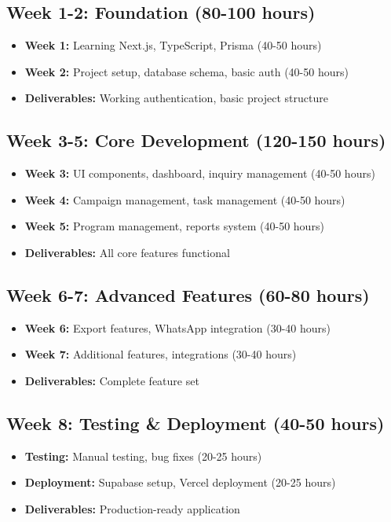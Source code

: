 \documentclass[11pt,a4paper]{article}
\begin{document}
\subsection{Week 1-2: Foundation (80-100 hours)}
\begin{itemize}
    \item \textbf{Week 1:} Learning Next.js, TypeScript, Prisma (40-50 hours)
    \item \textbf{Week 2:} Project setup, database schema, basic auth (40-50 hours)
    \item \textbf{Deliverables:} Working authentication, basic project structure
\end{itemize}

\subsection{Week 3-5: Core Development (120-150 hours)}
\begin{itemize}
    \item \textbf{Week 3:} UI components, dashboard, inquiry management (40-50 hours)
    \item \textbf{Week 4:} Campaign management, task management (40-50 hours)
    \item \textbf{Week 5:} Program management, reports system (40-50 hours)
    \item \textbf{Deliverables:} All core features functional
\end{itemize}

\subsection{Week 6-7: Advanced Features (60-80 hours)}
\begin{itemize}
    \item \textbf{Week 6:} Export features, WhatsApp integration (30-40 hours)
    \item \textbf{Week 7:} Additional features, integrations (30-40 hours)
    \item \textbf{Deliverables:} Complete feature set
\end{itemize}

\subsection{Week 8: Testing \& Deployment (40-50 hours)}
\begin{itemize}
    \item \textbf{Testing:} Manual testing, bug fixes (20-25 hours)
    \item \textbf{Deployment:} Supabase setup, Vercel deployment (20-25 hours)
    \item \textbf{Deliverables:} Production-ready application
\end{itemize}
\end{document}
